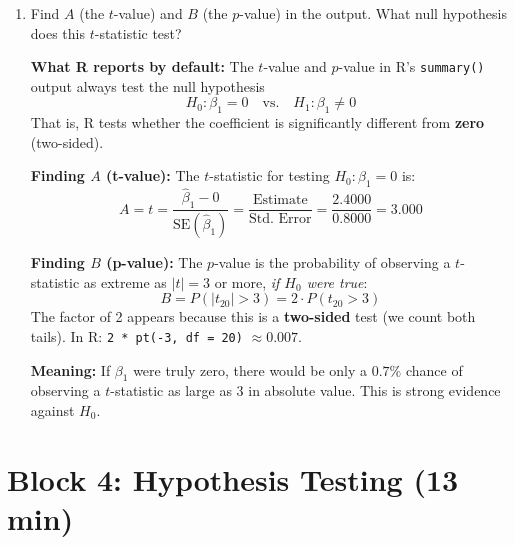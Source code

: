 \documentclass[11pt,a4paper]{article}
\begin{document}
\begin{enumerate}[label=(\alph*)]
\begin{solution}
\textbf{Intuition:} The $t$-distribution is ``wider'' than the normal to account for the fact that we \emph{don't know} $\sigma$ exactly. As the sample size grows, $\hat{\sigma}$ becomes a better and better estimate of $\sigma$, the extra uncertainty shrinks, and $t_{n-2} \to N(0,1)$.
\end{solution}

\item Find $A$ (the $t$-value) and $B$ (the $p$-value) in the output. What null hypothesis does this $t$-statistic test?

\begin{solution}
\textbf{What R reports by default:} The $t$-value and $p$-value in R's \verb!summary()! output always test the null hypothesis
\[
  H_0\colon \beta_1 = 0 \quad\text{vs.}\quad H_1\colon \beta_1 \ne 0
\]
That is, R tests whether the coefficient is significantly different from \textbf{zero} (two-sided).

\textbf{Finding $A$ (t-value):} The $t$-statistic for testing $H_0\colon \beta_1 = 0$ is:
\[
  A = t = \frac{\hat{\beta}_1 - 0}{\text{SE}(\hat{\beta}_1)}
  = \frac{\text{Estimate}}{\text{Std.\ Error}}
  = \frac{2.4000}{0.8000}
  = \boxed{3.000}
\]

\textbf{Finding $B$ (p-value):} The $p$-value is the probability of observing a $t$-statistic as extreme as $|t| = 3$ or more, \emph{if $H_0$ were true}:
\[
  B = P(|t_{20}| > 3) = 2 \cdot P(t_{20} > 3)
\]
The factor of 2 appears because this is a \textbf{two-sided} test (we count both tails). In R: \verb!2 * pt(-3, df = 20)! $\approx \boxed{0.007}$.

\textbf{Meaning:} If $\beta_1$ were truly zero, there would be only a $0.7\%$ chance of observing a $t$-statistic as large as $3$ in absolute value. This is strong evidence against $H_0$.
\end{solution}

\end{enumerate}

\section{Block 4: Hypothesis Testing \textnormal{(13 min)}}
\end{document}
